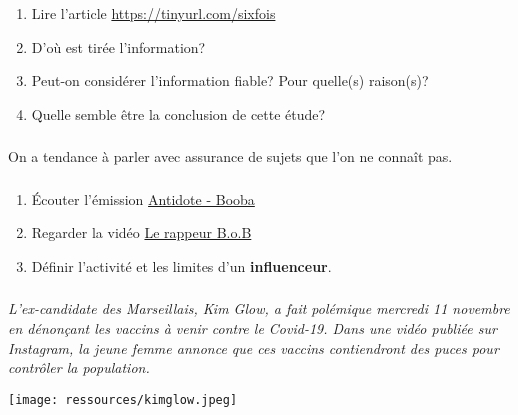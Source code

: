 \documentclass[svgnames,11pt]{beamer}
\begin{document}
\begin{frame}
    \frametitle{}

    \begin{activite}
        \begin{enumerate}
            \item Lire l'article \url{https://tinyurl.com/sixfois}
            \item D'où est tirée l'information?
            \item Peut-on considérer l'information fiable? Pour quelle(s) raison(s)?
            \item Quelle semble être la conclusion de cette étude?
        \end{enumerate}
        \end{activite}

\end{frame}
\begin{frame}
    \frametitle{}

    \begin{aretenir}[Biais 3]
    \centering On a tendance à parler avec assurance de sujets que l'on ne connaît pas.
    \end{aretenir}
\end{frame}
\begin{frame}
    \frametitle{}
\begin{activite}
\begin{enumerate}
    \item Écouter l'émission \href{https://www.franceinter.fr/embed/player/aod/8d4e5c50-df6a-4189-a4a3-3453bf875477}{Antidote - Booba}
    \item Regarder la vidéo \href{https://www.sciencesetavenir.fr/videos/le-rappeur-qui-croyait-que-la-terre-etait-plate-a-definitivement-perdu-la-partie_l3vzx8}{Le rappeur B.o.B}
    \item Définir l'activité et les limites d'un \textbf{influenceur}.
\end{enumerate}
\end{activite}
    

\end{frame}
\begin{frame}
    \frametitle{}

    \begin{aretenir}
    \centering \emph{L'ex-candidate des Marseillais, Kim Glow, a fait polémique mercredi 11 novembre en dénonçant les vaccins à venir contre le Covid-19. Dans une vidéo publiée sur Instagram, la jeune femme annonce que ces vaccins contiendront des puces pour contrôler la population. }
    \end{aretenir}
\begin{center}
\centering
\texttt{[image: ressources/kimglow.jpeg]}
\end{center}
\end{frame}
\end{document}

